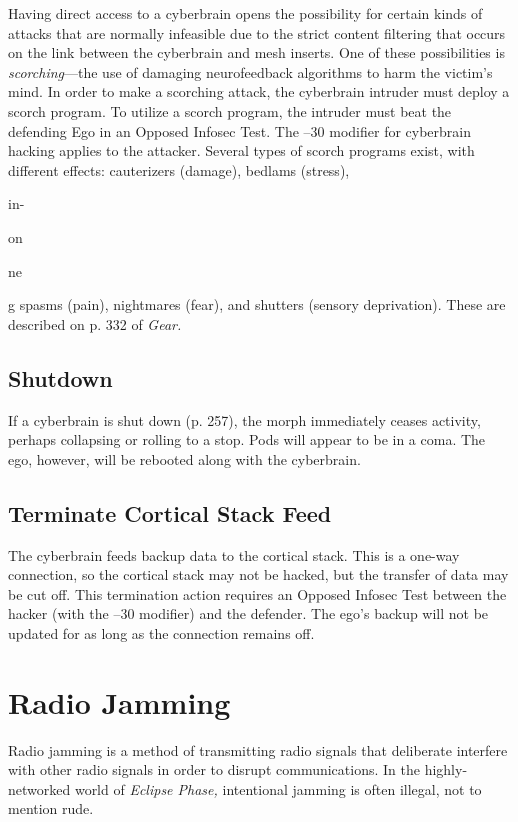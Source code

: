 Having direct access to a cyberbrain opens the possibility
for certain kinds of attacks that are normally infeasible
due to the strict content filtering that occurs on
the link between the cyberbrain and mesh inserts. One 
of these possibilities is \textit{scorching}—the use of damaging 
neurofeedback algorithms to harm the victim's mind.
In order to make a scorching attack, the cyberbrain 
intruder must deploy a scorch program. To utilize a 
scorch program, the intruder must beat the defending 
Ego in an Opposed Infosec Test. The –30 modifier for 
cyberbrain hacking applies to the attacker.
Several types of scorch programs exist, with different
effects: cauterizers (damage), bedlams (stress),

in-

on

ne 

g
spasms (pain), nightmares (fear), and shutters (sensory 
deprivation). These are described on p. 332 of \textit{Gear.}

\subsection{Shutdown}

If a cyberbrain is shut down (p. 257), the morph immediately
ceases activity, perhaps collapsing or rolling
to a stop. Pods will appear to be in a coma. The ego, 
however, will be rebooted along with the cyberbrain.

\subsection{Terminate Cortical Stack Feed}

The cyberbrain feeds backup data to the cortical stack. 
This is a one-way connection, so the cortical stack may 
not be hacked, but the transfer of data may be cut off. 
This termination action requires an Opposed Infosec 
Test between the hacker (with the –30 modifier) and 
the defender. The ego's backup will not be updated for 
as long as the connection remains off.

\section{Radio Jamming}

Radio jamming is a method of transmitting radio 
signals that deliberate interfere with other radio 
signals in order to disrupt communications. In the 
highly-networked world of \textit{Eclipse Phase,} intentional 
jamming is often illegal, not to mention rude.

